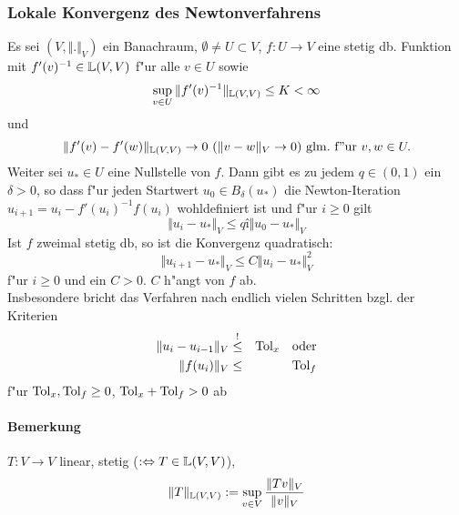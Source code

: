\documentclass{scrartcl}
\begin{document}
\subsubsection{Lokale Konvergenz des Newtonverfahrens}
Es sei $(V, \Vert.\Vert_V)$ ein Banachraum, $\emptyset \neq U \subset V$, $f: U \longrightarrow V$ eine stetig db. Funktion mit $f'(v)^{-1} \in \mathbb{L}(V,V)$ f"ur alle $v \in U$  sowie $$\sup\limits_{v \in U} \Vert f'(v)^{-1} \Vert_{\mathbb{L}(V,V)} \leq K < \infty$$ und $$\Vert f'(v) - f'(w) \Vert_{\mathbb{L}(V,V)} \rightarrow 0 \  (\Vert v - w \Vert_V \rightarrow 0) \ \mathrm{glm. \ f"ur \ } v,w \in U.$$
Weiter sei $u_* \in U$ eine Nullstelle von $f$.
Dann gibt es zu jedem $q \in (0,1)$ ein $\delta > 0$, so dass f"ur jeden Startwert $u_0 \in B_\delta(u_*)$ die Newton-Iteration $u_{i+1} = u_i - f'(u_i)^{-1}f(u_i)$ wohldefiniert ist und f"ur $i \geq 0$ gilt
$$\Vert u_i - u_* \Vert_V \leq qî \Vert u_0 - u_* \Vert_V$$
Ist $f$ zweimal stetig db, so ist die Konvergenz quadratisch:
$$\Vert u_{i+1} - u_* \Vert_V \leq C \Vert u_i - u_* \Vert_V^2$$
f"ur $i \geq 0$ und ein $C > 0$. $C$ h"angt von $f$ ab. \\
Insbesondere bricht das Verfahren nach endlich vielen Schritten bzgl. der Kriterien 
\begin{eqnarray*}
\Vert u_i - u_{i-1} \Vert_V & \stackrel{!}{\leq} & \mathrm{Tol}_x \quad \mathrm{oder} \\
\Vert f(u_i) \Vert_V & \leq & \mathrm{Tol}_f
\end{eqnarray*}
 f"ur $\mathrm{Tol}_x, \mathrm{Tol}_f \geq 0$, $\mathrm{Tol}_x + \mathrm{Tol}_f > 0$ ab

\paragraph*{Bemerkung}
$T: V \longrightarrow V$ linear, stetig ($:\Leftrightarrow T \in \mathbb{L}(V,V)$),
$$ \Vert T \Vert_{\mathbb{L}(V,V)} := \sup\limits_{v \in V} \frac{ \Vert Tv \Vert_V}{\Vert v \Vert_V}$$
\end{document}
